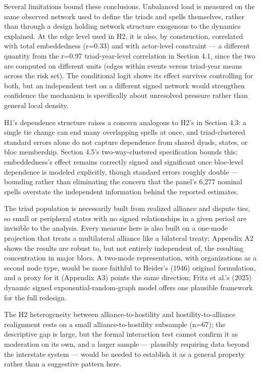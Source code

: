 \documentclass[Afour,sageh,times,doublespace]{sagej}
\begin{document}
Several limitations bound these conclusions. Unbalanced load is measured on the same observed network used to define the triads and spells themselves, rather than through a design holding network structure exogenous to the dynamics explained. At the edge level used in H2, it is also, by construction, correlated with total embeddedness (r=0.33) and with actor-level constraint --- a different quantity from the r=0.97 triad-year-level correlation in Section 4.1, since the two are computed on different units (edges within events versus triad-year means across the risk set). The conditional logit shows its effect survives controlling for both, but an independent test on a different signed network would strengthen confidence the mechanism is specifically about unresolved pressure rather than general local density.

H1's dependence structure raises a concern analogous to H2's in Section 4.3: a single tie change can end many overlapping spells at once, and triad-clustered standard errors alone do not capture dependence from shared dyads, states, or bloc membership. Section 4.5's two-way-clustered specification bounds this: embeddedness's effect remains correctly signed and significant once bloc-level dependence is modeled explicitly, though standard errors roughly double --- bounding rather than eliminating the concern that the panel's 6,277 nominal spells overstate the independent information behind the reported estimates.

The triad population is necessarily built from realized alliance and dispute ties, so small or peripheral states with no signed relationships in a given period are invisible to the analysis. Every measure here is also built on a one-mode projection that treats a multilateral alliance like a bilateral treaty; Appendix A2 shows the results are robust to, but not entirely independent of, the resulting concentration in major blocs. A two-mode representation, with organizations as a second node type, would be more faithful to Heider's (1946) original formulation, and a proxy for it (Appendix A3) points the same direction; Fritz et al.'s (2025) dynamic signed exponential-random-graph model offers one plausible framework for the full redesign.

The H2 heterogeneity between alliance-to-hostility and hostility-to-alliance realignment rests on a small alliance-to-hostility subsample (n=67); the descriptive gap is large, but the formal interaction test cannot confirm it as moderation on its own, and a larger sample --- plausibly requiring data beyond the interstate system --- would be needed to establish it as a general property rather than a suggestive pattern here.
\end{document}
